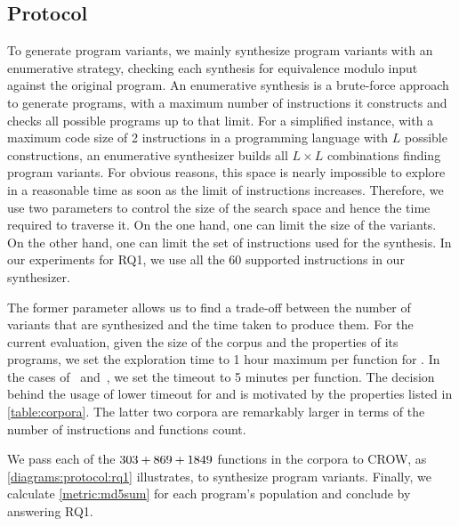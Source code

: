 \subsection*{Protocol}

To generate program variants, we mainly synthesize program variants with an enumerative strategy, checking each synthesis for equivalence modulo input \cite{Li2018} against the original program. An enumerative synthesis is a brute-force approach to generate programs, with a maximum number of instructions it constructs and checks all possible programs up to that limit. For a simplified instance, with a maximum code size of 2 instructions in a programming language with $L$ possible constructions, an enumerative synthesizer builds all $L\times L$ combinations finding program variants. For obvious reasons, this space is nearly impossible to explore in a reasonable time as soon as the limit of instructions increases.
Therefore, we use two parameters to control the size of the search space and hence the time required to traverse it.
On the one hand, one can limit the size of the variants. On the other hand, one can limit the set of instructions used for the synthesis. In our experiments for RQ1, we use all the $60$ supported instructions in our synthesizer.

The former parameter allows us to find a trade-off between the number of variants that are synthesized and the time taken to produce them. For the current evaluation, given the size of the corpus and the properties of its programs, we set the exploration time to 1 hour maximum per function for \corpusrosetta. In the cases of \corpussodium\ and\ \corpusqrcode, we set the timeout to 5 minutes per function. The decision behind the usage of lower timeout for \corpussodium
and \corpussodium is motivated by the properties listed in \autoref{table:corpora}. The latter two corpora are remarkably larger in terms of the number of instructions and functions count. 

We pass each of the $303 + 869 + 1849$ functions in the corpora to CROW, as \autoref{diagrams:protocol:rq1} illustrates, to synthesize program variants. Finally, we calculate \autoref{metric:md5sum} for each program's population and conclude by answering RQ1.
